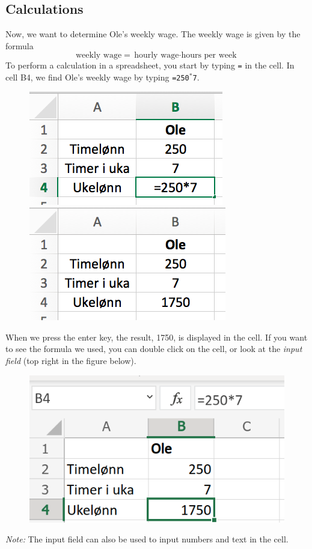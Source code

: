 \subsection{Calculations}
Now, we want to determine Ole's weekly wage.
The weekly wage is given by the formula
\[ \text{weekly wage}={\text{hourly wage}\cdot \text{hours per week}} \]
To perform a calculation in a spreadsheet, you start by typing {\tt{=}} in the cell. In cell B4, we find Ole's weekly wage by typing {\tt=250$ ^* $7}.
\begin{figure}[H]
	\centering
	\includegraphics[scale=0.3]{figs/ex3}\qquad
	\includegraphics[scale=0.3]{figs/ex4}
\end{figure}
When we press the enter key, the result, 1750, is displayed in the cell. If you want to see the formula we used, you can double click on the cell, or look at the \textit{input field} (top right in the figure below).
\begin{figure}[H]
	\centering
	\includegraphics[scale=0.25]{figs/intast}
\end{figure}
\textsl{Note:} The input field can also be used to input numbers and text in the cell.

